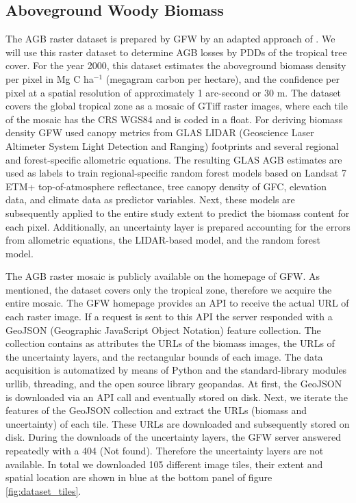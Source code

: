 	\subsection{Aboveground Woody Biomass}
		The \ac{AGB} raster dataset is prepared by \ac{GFW} by an adapted approach of \citet{Baccini2012,Baccini2015,Baccini2017}. We will use this raster dataset to determine \ac{AGB} losses by \acp{PDD} of the tropical tree cover. For the year 2000, this dataset estimates the aboveground biomass density per pixel in Mg C ha$^{-1}$ (megagram carbon per hectare), and the confidence per pixel at a spatial resolution of approximately 1 arc-second or 30 m. The dataset covers the global tropical zone as a mosaic of \ac{GTiff} raster images, where each tile of the mosaic has the \ac{CRS} \ac{WGS84} and is coded in a float. For deriving biomass density \ac{GFW} used canopy metrics from GLAS LIDAR (Geoscience Laser Altimeter System Light Detection and Ranging) footprints and several regional and forest-specific allometric equations. The resulting GLAS \ac{AGB} estimates are used as labels to train regional-specific random forest models based on Landsat 7 ETM+ top-of-atmosphere reflectance, tree canopy density of \ac{GFC}, elevation data, and climate data as predictor variables. Next, these models are subsequently applied to the entire study extent to predict the biomass content for each pixel. Additionally, an uncertainty layer is prepared accounting for the errors from allometric equations, the LIDAR-based model, and the random forest model.

		The \ac{AGB} raster mosaic is publicly available on the homepage of \ac{GFW}. As mentioned, the dataset covers only the tropical zone, therefore we acquire the entire mosaic. The \ac{GFW} homepage provides an \ac{API} to receive the actual \ac{URL} of each raster image. If a request is sent to this \ac{API} the server responded with a GeoJSON (Geographic JavaScript Object Notation) feature collection. The collection contains as attributes the \acp{URL} of the biomass images, the \acp{URL} of the uncertainty layers, and the rectangular bounds of each image. The data acquisition is automatized by means of Python and the standard-library modules urllib, threading, and the open source library geopandas. At first, the GeoJSON is downloaded via an \ac{API} call and eventually stored on disk. Next, we iterate the features of the GeoJSON collection and extract the \ac{URL}s (biomass and uncertainty) of each tile. These \ac{URL}s are downloaded and subsequently stored on disk. During the downloads of the uncertainty layers, the \ac{GFW} server answered repeatedly with a 404 (Not found). Therefore the uncertainty layers are not available. In total we downloaded 105 different image tiles, their extent and spatial location are shown in blue at the bottom panel of figure \ref{fig:dataset_tiles}.


